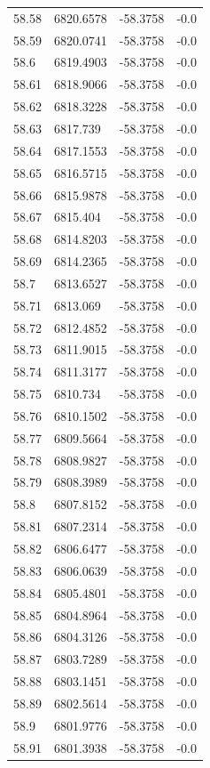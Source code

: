 \begin{table}[H]
\begin{tabular}{llll}
58.58 & 6820.6578 & -58.3758 & -0.0 \\
58.59 & 6820.0741 & -58.3758 & -0.0 \\
58.6 & 6819.4903 & -58.3758 & -0.0 \\
58.61 & 6818.9066 & -58.3758 & -0.0 \\
58.62 & 6818.3228 & -58.3758 & -0.0 \\
58.63 & 6817.739 & -58.3758 & -0.0 \\
58.64 & 6817.1553 & -58.3758 & -0.0 \\
58.65 & 6816.5715 & -58.3758 & -0.0 \\
58.66 & 6815.9878 & -58.3758 & -0.0 \\
58.67 & 6815.404 & -58.3758 & -0.0 \\
58.68 & 6814.8203 & -58.3758 & -0.0 \\
58.69 & 6814.2365 & -58.3758 & -0.0 \\
58.7 & 6813.6527 & -58.3758 & -0.0 \\
58.71 & 6813.069 & -58.3758 & -0.0 \\
58.72 & 6812.4852 & -58.3758 & -0.0 \\
58.73 & 6811.9015 & -58.3758 & -0.0 \\
58.74 & 6811.3177 & -58.3758 & -0.0 \\
58.75 & 6810.734 & -58.3758 & -0.0 \\
58.76 & 6810.1502 & -58.3758 & -0.0 \\
58.77 & 6809.5664 & -58.3758 & -0.0 \\
58.78 & 6808.9827 & -58.3758 & -0.0 \\
58.79 & 6808.3989 & -58.3758 & -0.0 \\
58.8 & 6807.8152 & -58.3758 & -0.0 \\
58.81 & 6807.2314 & -58.3758 & -0.0 \\
58.82 & 6806.6477 & -58.3758 & -0.0 \\
58.83 & 6806.0639 & -58.3758 & -0.0 \\
58.84 & 6805.4801 & -58.3758 & -0.0 \\
58.85 & 6804.8964 & -58.3758 & -0.0 \\
58.86 & 6804.3126 & -58.3758 & -0.0 \\
58.87 & 6803.7289 & -58.3758 & -0.0 \\
58.88 & 6803.1451 & -58.3758 & -0.0 \\
58.89 & 6802.5614 & -58.3758 & -0.0 \\
58.9 & 6801.9776 & -58.3758 & -0.0 \\
58.91 & 6801.3938 & -58.3758 & -0.0 \\

\end{tabular}
\end{table}
